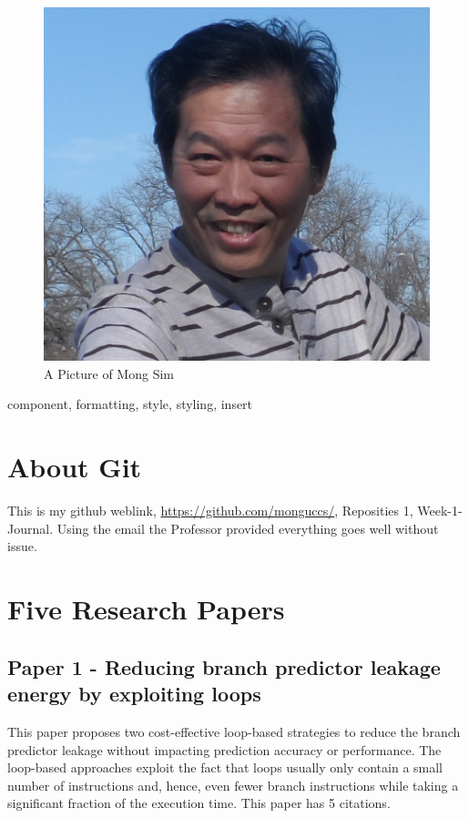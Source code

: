 \documentclass[conference]{IEEEtran}
\begin{document}
\begin{figure}[h!] 
\centering
  \includegraphics[width=\linewidth]{Mong.png}
  \caption{A Picture of Mong Sim}
   \label{fig:Mong}
\end{figure}


\begin{IEEEkeywords}
component, formatting, style, styling, insert
\end{IEEEkeywords}

\section{About Git}
This is my github weblink, \href{https://github.com/monguccs/}{https://github.com/monguccs/},  Reposities 1, Week-1-Journal. Using the email the Professor provided everything goes well without issue.
 


\section{Five Research Papers}

\subsection{Paper 1 - Reducing branch predictor leakage energy by exploiting loops}

This paper \cite{b1} proposes two cost-effective loop-based strategies to reduce the branch predictor leakage without impacting prediction accuracy or performance. The loop-based approaches exploit the fact that loops usually only contain a small number of instructions and, hence, even fewer branch instructions while taking a significant fraction of the execution time. This paper has 5 citations.
\end{document}
